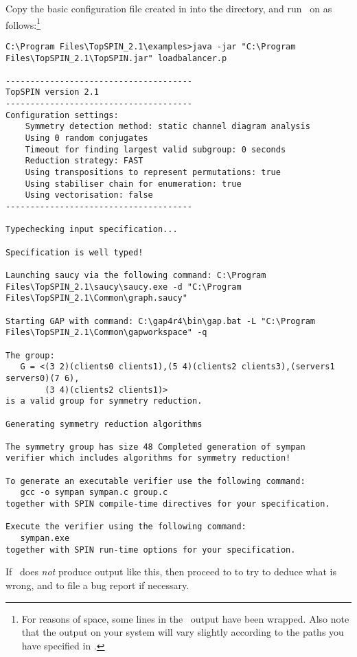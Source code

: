 Copy the basic configuration file created in
 into the  directory,
and run \topspin\ on  as
follows:\footnote{For reasons of space, some lines in the \topspin\
output have been wrapped. Also note that the output on your system
will vary slightly according to the paths you have specified in
.}
%
\begin{lstlisting}
C:\Program Files\TopSPIN_2.1\examples>java -jar "C:\Program
Files\TopSPIN_2.1\TopSPIN.jar" loadbalancer.p

--------------------------------------
TopSPIN version 2.1
--------------------------------------
Configuration settings:
    Symmetry detection method: static channel diagram analysis
    Using 0 random conjugates
    Timeout for finding largest valid subgroup: 0 seconds
    Reduction strategy: FAST
    Using transpositions to represent permutations: true
    Using stabiliser chain for enumeration: true
    Using vectorisation: false
--------------------------------------

Typechecking input specification...

Specification is well typed!

Launching saucy via the following command: C:\Program
Files\TopSPIN_2.1\saucy\saucy.exe -d "C:\Program
Files\TopSPIN_2.1\Common\graph.saucy"

Starting GAP with command: C:\gap4r4\bin\gap.bat -L "C:\Program
Files\TopSPIN_2.1\Common\gapworkspace" -q

The group:
   G = <(3 2)(clients0 clients1),(5 4)(clients2 clients3),(servers1 servers0)(7 6),
        (3 4)(clients2 clients1)>
is a valid group for symmetry reduction.

Generating symmetry reduction algorithms

The symmetry group has size 48 Completed generation of sympan
verifier which includes algorithms for symmetry reduction!

To generate an executable verifier use the following command:
   gcc -o sympan sympan.c group.c
together with SPIN compile-time directives for your specification.

Execute the verifier using the following command:
   sympan.exe
together with SPIN run-time options for your specification.
\end{lstlisting}
%
If \topspin\ does \emph{not} produce output like this, then proceed
to \chapref{troubleshooting} to try to deduce what is wrong, and to
file a bug report if necessary.

